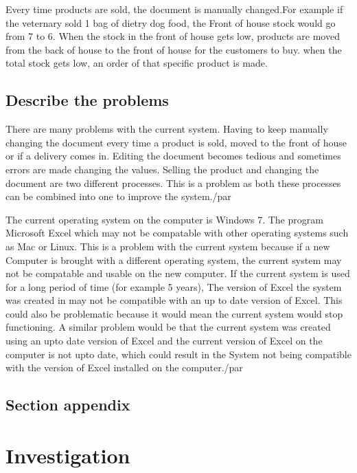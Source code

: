 Every time products are sold, the document is manually changed.For example if the veternary sold 1 bag of dietry dog food, the Front of house stock would go from 7 to 6. When the stock in the front of house gets low, products are moved from the back of house to the front of house for the customers to buy. when the total stock gets low, an order of that specific product is made.\par

\subsection{Describe the problems}

There are many problems with the current system. Having to keep manually changing the document every time a product is sold, moved to the front of house or if a delivery comes in. Editing the document becomes tedious and sometimes errors are made changing the values. Selling the product and changing the document are two different processes. This is a problem as both these processes can be combined into one to improve the system./par

The current operating system on the computer is Windows 7. The program Microsoft Excel which may not be compatable with other operating systems such as Mac or Linux. This is a problem with the current system because if a new Computer is brought with a different operating system, the current system may not be compatable and usable on the new computer. If the current system is used for a long period of time (for example 5 years), The version of Excel the system was created in may not be compatible with an up to date version of Excel. This could also be problematic because it would mean the current system would stop functioning. A similar problem would be that the current system was created using an upto date version of Excel and the current version of Excel on the computer is not upto date, which could result in the System not being compatible with the version of Excel installed on the computer./par




\subsection{Section appendix}

\section{Investigation}


